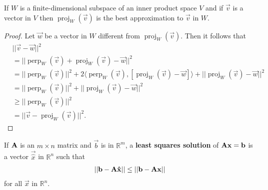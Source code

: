 \documentclass{memoir}
\newcommand{\proj}{\operatorname{proj}}
\newcommand{\Perp}{\operatorname{perp}}
\begin{document}
\begin{theorem}
    If $W$ is a finite-dimensional subspace of an inner product space $V$ and if $\vec{v}$ is a vector in $V$ then $\proj_W(\vec{v})$ is the best approximation to $\vec{v}$ in $W$.
\end{theorem}
\begin{proof}
    Let $\vec{w}$ be a vector in $W$ different from $\proj_W(\vec{v})$. Then it follows that
    \begin{align*}
        &||\vec{v} - \vec{w}||^2 \\
        &= ||\Perp_W(\vec{v}) + \proj_W(\vec{v}) - \vec{w}||^2 \\
        &= ||\Perp_W(\vec{v})||^2 + 2\langle \Perp_W(\vec{v}), [\proj_W(\vec{v}) - \vec{w}]\rangle + ||\proj_W(\vec{v}) - \vec{w}||^2 \\
        &=||\Perp_W(\vec{v})||^2 + ||\proj_W(\vec{v}) - \vec{w}||^2 \\
        &\ge ||\Perp_W(\vec{v})||^2 \\ 
        &= ||\vec{v} - \proj_W(\vec{v})||^2.
    \end{align*}
\end{proof}

\begin{definition}
    If $\boldsymbol{\mathbf{A}}$ is an $m \times n$ matrix and $\vec{b}$ is in $\mathbb{R}^m$, a \textbf{least squares solution} of $\boldsymbol{\mathbf{A}} \boldsymbol{\mathbf{x}} = \boldsymbol{\mathbf{b}}$ is a vector $\vec{\hat{x}}$ in $\mathbb{R}^n$ such that
    \begin{align*}
        ||\boldsymbol{\mathbf{b}} - \boldsymbol{\mathbf{A}} \boldsymbol{\mathbf{\hat{x}}}|| \le ||\boldsymbol{\mathbf{b}} - \boldsymbol{\mathbf{A}} \boldsymbol{\mathbf{x}}||
    \end{align*}
    for all $\vec{x}$ in $\mathbb{R}^n$.
\end{definition}
\end{document}
